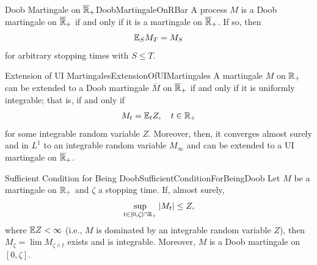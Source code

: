 \begin{prop}{Doob Martingale on $\overline{\mathbb{R}}_+$}{DoobMartingaleOnRBar}
	A process $M$ is a Doob martingale on $\overline{\mathbb{R}}_+$ if and only if it is a martingale on $\overline{\mathbb{R}}_+$. If so, then
	\begin{equation}\label{eq:DoobMartingaleRBarProp}
		\mathbb{E}_S M_T = M_S
	\end{equation}
	for arbitrary stopping times with $S \le T$.
\end{prop}

\begin{thm}{Extension of UI Martingales}{ExtensionOfUIMartingales}
	A martingale $M$ on $\mathbb{R}_+$ can be extended to a Doob martingale $\overline{M}$ on $\overline{\mathbb{R}}_+$ if and only if it is uniformly integrable; that is, if and only if
	\begin{equation}\label{eq:UIMartingaleExtension}
		M_t = \mathbb{E}_t Z, \quad t \in \mathbb{R}_+
	\end{equation}
	for some integrable random variable $Z$. Moreover, then, it converges almost surely and in $L^1$ to an integrable random variable $M_\infty$ and can be extended to a UI martingale on $\overline{\mathbb{R}}_+$.
\end{thm}

\begin{prop}{Sufficient Condition for Being Doob}{SufficientConditionForBeingDoob}
	Let $M$ be a martingale on $\mathbb{R}_+$ and $\zeta$ a stopping time. If, almost surely,
	\begin{equation}\label{eq:DoobDominationCondition}
		\sup_{t \in [0, \zeta] \cap \mathbb{R}_+} |M_t| \le Z,
	\end{equation}
	where $\mathbb{E} Z < \infty$ (i.e., $M$ is dominated by an integrable random variable $Z$), then $M_\zeta = \lim M_{\zeta \land t}$ exists and is integrable. Moreover, $M$ is a Doob martingale on $[0, \zeta]$.
\end{prop}
